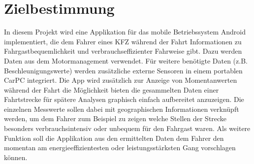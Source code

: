 \chapter{Zielbestimmung}
In diesem Projekt wird eine Applikation für das mobile Betriebssystem Android implementiert, die dem Fahrer eines KFZ während der Fahrt Informationen zu Fahrgastbequemlichkeit und verbrauchseffizienter Fahrweise gibt. Dazu werden Daten aus dem Motormanagement verwendet. Für weitere benötigte Daten (z.B. Beschleunigungswerte) werden zusätzliche externe Sensoren in einem portablen CarPC integriert. Die App wird zusätzlich zur Anzeige von Momentanwerten während der Fahrt die Möglichkeit bieten die gesammelten Daten einer Fahrtstrecke für spätere Analysen graphisch einfach aufbereitet anzuzeigen. Die einzelnen Messwerte sollen dabei mit geographischen Informationen verknüpft werden, um dem Fahrer zum Beispiel zu zeigen welche Stellen der Strecke besonders verbrauchsintensiv oder unbequem für den Fahrgast waren. \newline
\newline
Als weitere Funktion soll die Applikation aus den ermittelten Daten dem Fahrer den momentan am energieeffizientesten oder leistungsstärksten Gang vorschlagen können.